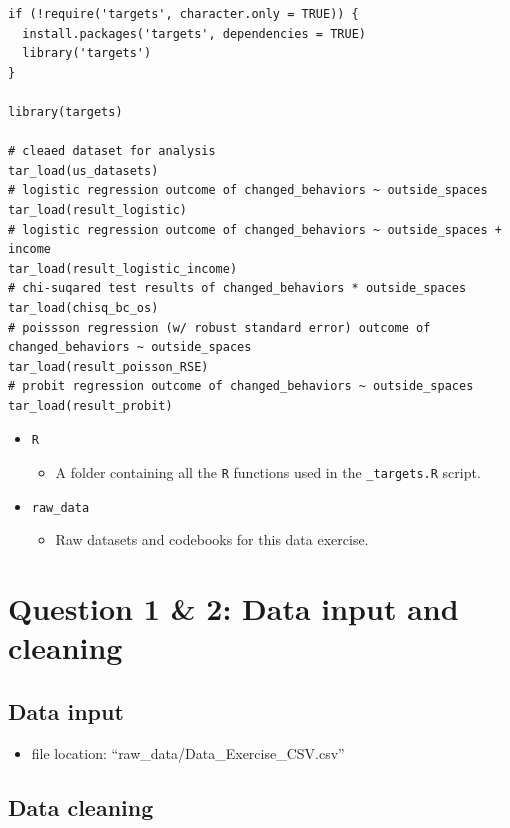 \documentclass[
  letterpaper,
  DIV=11,
  numbers=noendperiod]{scrartcl}
\providecommand{\tightlist}{%
  \setlength{\itemsep}{0pt}\setlength{\parskip}{0pt}}
\begin{document}
\begin{verbatim}
if (!require('targets', character.only = TRUE)) {
  install.packages('targets', dependencies = TRUE)
  library('targets')
}

library(targets)

# cleaed dataset for analysis
tar_load(us_datasets)
# logistic regression outcome of changed_behaviors ~ outside_spaces
tar_load(result_logistic)
# logistic regression outcome of changed_behaviors ~ outside_spaces + income
tar_load(result_logistic_income)
# chi-suqared test results of changed_behaviors * outside_spaces
tar_load(chisq_bc_os)
# poissson regression (w/ robust standard error) outcome of changed_behaviors ~ outside_spaces
tar_load(result_poisson_RSE)
# probit regression outcome of changed_behaviors ~ outside_spaces
tar_load(result_probit)
\end{verbatim}

\begin{itemize}
\item
  \texttt{R}

  \begin{itemize}
  \tightlist
  \item
    A folder containing all the \texttt{R} functions used in the
    \texttt{\_targets.R} script.
  \end{itemize}
\item
  \texttt{raw\_data}

  \begin{itemize}
  \tightlist
  \item
    Raw datasets and codebooks for this data exercise.
  \end{itemize}
\end{itemize}

\section{Question 1 \& 2: Data input and
cleaning}\label{question-1-2-data-input-and-cleaning}

\subsection{Data input}\label{data-input}

\begin{itemize}
\tightlist
\item
  file location: ``raw\_data/Data\_Exercise\_CSV.csv''
\end{itemize}

\subsection{Data cleaning}\label{data-cleaning}
\end{document}
